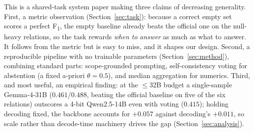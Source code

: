 This is a shared-task system paper making three claims of decreasing generality.
First, a metric observation (Section~\ref{sec:task}): because a correct empty set
scores a perfect F\textsubscript{1}, the empty baseline already beats the official
one on the null-heavy relations, so the task rewards \emph{when to answer} as much
as what to answer. It follows from the metric but is easy to miss, and it shapes
our design. Second, a reproducible pipeline with no trainable parameters
(Section~\ref{sec:method}), combining standard parts: scope-grounded prompting,
self-consistency voting for abstention (a fixed a-priori $\theta{=}0.5$), and
median aggregation for numerics. Third, and most useful, an empirical finding: at
the ${\le}$32B budget a single-sample Gemma-4-31B ($0.461$/$0.488$, beating the
official baseline on five of the six relations) outscores a 4-bit Qwen2.5-14B even
with voting ($0.415$); holding decoding fixed, the backbone accounts for $+0.057$
against decoding's $+0.011$, so scale rather than decode-time machinery drives the
gap (Section~\ref{sec:analysis}).
